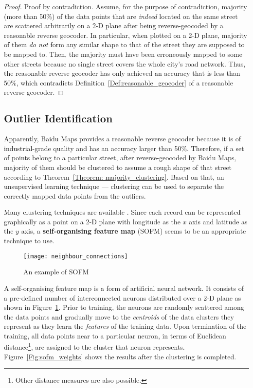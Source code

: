 \begin{proof}
Proof by contradiction. Assume, for the purpose of contradiction, majority (more than 50\%) of the data points that are \emph{indeed} located on the same street are scattered arbitrarily on a 2-D plane after being reverse-geocoded by a reasonable reverse geocoder. In particular, when plotted on a 2-D plane, majority of them \emph{do not} form any similar shape to that of the street they are supposed to be mapped to. Then, the majority must have been erroneously mapped to some other streets because no single street covers the whole city's road network. Thus, the reasonable reverse geocoder has only achieved an accuracy that is less than 50\%, which contradicts Definition~\ref{Def:reasonable_geocoder} of a reasonable reverse geocoder. 
\end{proof}

\subsection{Outlier Identification}\label{SubSec:outlier_identify}
Apparently, Baidu Maps provides a reasonable reverse geocoder because it is of industrial-grade quality and has an accuracy larger than 50\%. Therefore, if a set of points belong to a particular street, after reverse-geocoded by Baidu Maps, majo\-rity of them should be clustered to assume a rough shape of that street according to Theorem~\ref{Theorem: majority_clustering}. Based on that, an unsupervised learning technique --- clustering can be used to separate the correctly mapped data points from the outliers. 

Many clustering techniques are available \cite{LO05}. Since each record can be represented graphically as a point on a 2-D plane with longitude as the $x$ axis and latitude as the $y$ axis, a \textbf{self-organising feature map} (SOFM) \cite{TK82} seems to be an appropriate technique to use. 

\begin{figure}[h]
\texttt{[image: neighbour\_connections]}
\centering
\caption{An example of SOFM}\label{Fig:neighbour_connections}
\end{figure}

A self-organising feature map is a form of artificial neural network. It consists of a pre-defined number of interconnected neurons distributed over a 2-D plane as shown in Figure~\ref{Fig:neighbour_connections}. Prior to training, the neurons are randomly scattered among the data points and gradually move to the \emph{centroids} of the data clusters they represent as they learn the \emph{features} of the training data. Upon termination of the training, all data points near to a particular neuron, in terms of Euclidean distance\footnote{Other distance measures are also possible.}, are assigned to the cluster that neuron represents. Figure~\ref{Fig:sofm_weights} shows the results after the clustering is completed. 

